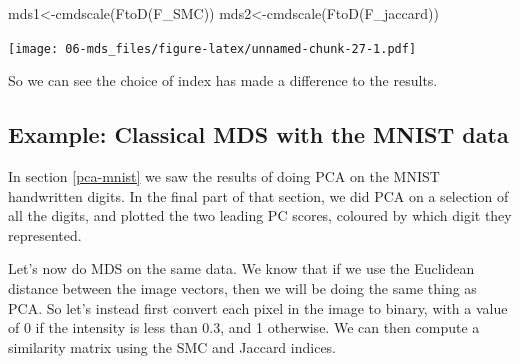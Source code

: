 \documentclass[
]{book}
\newenvironment{Shaded}{\begin{snugshade}}{\end{snugshade}}
\newcommand{\FunctionTok}[1]{\textcolor[rgb]{0.00,0.00,0.00}{#1}}
\newcommand{\NormalTok}[1]{#1}
\newcommand{\OtherTok}[1]{\textcolor[rgb]{0.56,0.35,0.01}{#1}}
\theoremstyle{definition}
\theoremstyle{definition}
\theoremstyle{definition}
\theoremstyle{definition}
\theoremstyle{remark}
\begin{document}
\begin{Shaded}
\begin{Highlighting}[]
\NormalTok{mds1}\OtherTok{\textless{}{-}}\FunctionTok{cmdscale}\NormalTok{(}\FunctionTok{FtoD}\NormalTok{(F\_SMC))}
\NormalTok{mds2}\OtherTok{\textless{}{-}}\FunctionTok{cmdscale}\NormalTok{(}\FunctionTok{FtoD}\NormalTok{(F\_jaccard))}
\end{Highlighting}
\end{Shaded}

\texttt{[image: 06-mds\_files/figure-latex/unnamed-chunk-27-1.pdf]}

So we can see the choice of index has made a difference to the results.

\hypertarget{example-classical-mds-with-the-mnist-data}{%
\subsection{Example: Classical MDS with the MNIST data}\label{example-classical-mds-with-the-mnist-data}}

In section \ref{pca-mnist} we saw the results of doing PCA on the MNIST handwritten digits. In the final part of that section, we did PCA on a selection of all the digits, and plotted the two leading PC scores, coloured by which digit they represented.

Let's now do MDS on the same data. We know that if we use the Euclidean distance between the image vectors, then we will be doing the same thing as PCA. So let's instead first convert each pixel in the image to binary, with a value of 0 if the intensity is less than 0.3, and 1 otherwise. We can then compute a similarity matrix using the SMC and Jaccard indices.
\end{document}
